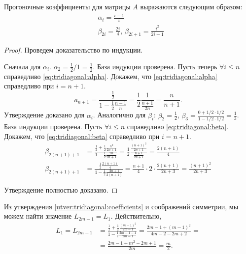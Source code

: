 \begin{utver}
\label{utver:tridiagonal:coefficients}
Прогоночные коэффициенты для матрицы $ A $ выражаются следующим образом:
\begin{align}
\label{eq:tridiagonal:alpha}
&\alpha_i = \frac{i-1}{i} \\
\label{eq:tridiagonal:beta}
&\beta_{2i} = \frac{2i}{4}, \,
\beta_{2i+1} = \frac{i^2}{2i+1}
\end{align}
\end{utver}
\begin{proof}
Проведем доказательство по индукции. 

Сначала для $ \alpha_i $. $ \alpha_2  = \frac{1}{2} / 1 = \frac{1}{2} $. База индукции проверена. Пусть теперь $ \forall i \leq n $ справедливо \eqref{eq:tridiagonal:alpha}. Докажем, что \eqref{eq:tridiagonal:alpha} справедливо при $ i = n + 1 $.
\[
    a_{n+1} = \frac{\frac{1}{2}}{1 - \frac{1}{2}\frac{n - 1}{n}}
    = \frac{1}{2} \frac{1}{\frac{n+1}{2n}} = \frac{n}{n+1}.
\]
Утверждение доказано для $ \alpha_i $. Аналогично для $ \beta_i $: 
$ \beta_2 = \frac{1}{2} $, 
$  \beta_3 = \frac{0 + 1/2 \cdot 1/2}{1 - 1/2 \cdot 1/2} = \frac{1}{3} $. База индукции проверена. Пусть $ \forall i \leq n $ справедливо \eqref{eq:tridiagonal:beta}. Докажем, что \eqref{eq:tridiagonal:beta} справедливо при $ i = n + 1 $.
\begin{align*}
    \beta_{2(n+1)+1} 
    &= \frac{
        \frac{1}{2} + \frac{1}{2} \frac{n^2}{2n+1}
    }{
        1 - \frac{1}{2} \frac{2n}{2n+1}
    }
    = \frac{1}{2} \frac{
        \frac{(n+1)^2}{2n+1}
    }{
        \frac{n+1}{2n+1}
    }
    = \frac{2(n+1)}{4} \\
    \beta_{2(n+1)+1}
    &= \frac{
        \frac{1}{2} \frac{2(n+1)}{4}
    }{
        1 - \frac{1}{2} \frac{2n+1}{2(n+1)}
    }
    = \frac{n+1}{4} \cdot 2 \cdot \frac{2(n+1)}{2n+3} = \frac{(n+1)^2}{2n+3}
\end{align*}

Утверждение полностью доказано.
\end{proof}

Из утверждения \ref{utver:tridiagonal:coefficients} и соображений симметрии, мы можем найти значение $ L_{2m - 1} = L_1 $. Действительно,
\begin{align}
\label{eq:lower_bound:recurrent_boundaries}
L_1 = L_{2m-1} &= 
\frac{
    \frac{1}{2} + \frac{1}{2}\frac{(m-1)^2}{2m-1}
}{
    1 - \frac{1}{2}\frac{2m-1-1}{2m-1}
} =
\frac{
    2m - 1 + (m-1)^2
}{
    4m - 2 - 2m + 2
} = \nonumber \\
& = \frac{2m - 1 + m^2  - 2m + 1}{2m} = \frac{m}{2}.
\end{align}

